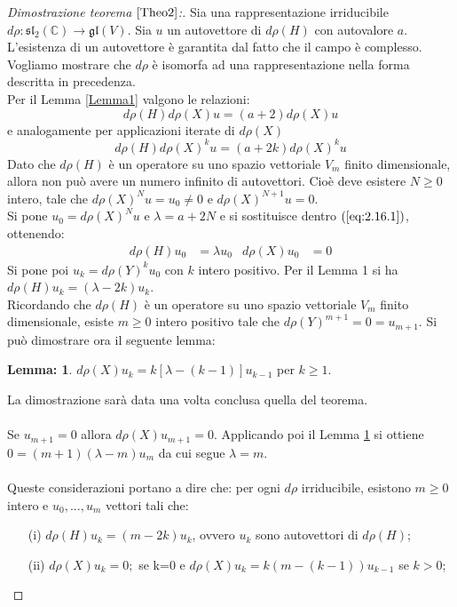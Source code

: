 \documentclass[12pt,a4paper]{report}
\theoremstyle{definition}
\theoremstyle{definition}
\theoremstyle{definition}
\newtheorem{Lem}[Def]{Lemma:}
\theoremstyle{definition}
\begin{document}
\begin{proof}[Dimostrazione teorema $\ref{Theo2}$:]
	Sia una rappresentazione irriducibile $d\rho:\mathfrak{sl_2(\mathbb{C})}\rightarrow \mathfrak{gl}(V)$. Sia $u$ un autovettore di $d\rho(H)$ con autovalore $a$. L'esistenza di un autovettore è garantita dal fatto che il campo è complesso. Vogliamo mostrare che $d\rho$ è isomorfa ad una rappresentazione nella forma descritta in precedenza.\\
	Per il Lemma \ref{Lemma1} valgono le relazioni: $$d\rho(H)d\rho(X)u=(a+2)d\rho(X)u$$ e analogamente per applicazioni iterate di $d\rho(X)$
	\begin{equation}
		\label{eq:2.16.1}
		d\rho(H)d\rho(X)^ku=(a+2k)d\rho(X)^ku
		\tag{1}
	\end{equation}
	Dato che $d\rho(H)$ è un operatore su uno spazio vettoriale $V_m$ finito dimensionale, allora non può avere un numero infinito di autovettori. Cioè deve esistere $N\geq 0$ intero, tale che $d\rho(X)^Nu=u_0\neq0$ e $d\rho(X)^{N+1}u=0$.\\
	Si pone $u_0=d\rho(X)^Nu$ e $\lambda=a+2N$ e si sostituisce dentro $(\ref{eq:2.16.1})$, ottenendo: 
	\begin{align*}
		d\rho(H)u_0&=\lambda u_0 & d\rho(X)u_0&=0
	\end{align*} 
	Si pone poi $u_k=d\rho(Y)^ku_0$ con $k$ intero positivo. Per il Lemma 1 si ha $d\rho(H)u_k=(\lambda-2k)u_k$.\\
	Ricordando che $d\rho(H)$ è un operatore su uno spazio vettoriale $V_m$ finito dimensionale, esiste $m\geq0$ intero positivo tale che  $d\rho(Y)^{m+1}=0=u_{m+1}$. Si può dimostrare ora il seguente lemma:
	\begin{Lem}\label{Lemma2}
		$d\rho(X)u_k=k[\lambda-(k-1)]u_{k-1}$ per $k\geq 1$.
	\end{Lem} 
La dimostrazione sarà data una volta conclusa quella del teorema.\\
\\Se $u_{m+1}=0$ allora $d\rho(X)u_{m+1}=0$. Applicando poi il Lemma \ref{Lemma2} si ottiene $0=(m+1)(\lambda-m)u_m$ da cui segue $\lambda=m$.\\
\\
	Queste considerazioni portano a dire che: per ogni $d\rho $ irriducibile, esistono $m\geq0$ intero e $u_0,...,u_m$ vettori tali che:\begin{itemize}
		\item[(i)] $d\rho(H)u_k=(m-2k)u_k$, ovvero $u_k$ sono autovettori di $d\rho(H)$;
		\item[(ii)] $d\rho(X)u_k=0;$ se k=0 e $d\rho(X)u_k=k(m-(k-1))u_{k-1}$ se $k>0$;

\end{itemize}
\end{proof}
\end{document}
